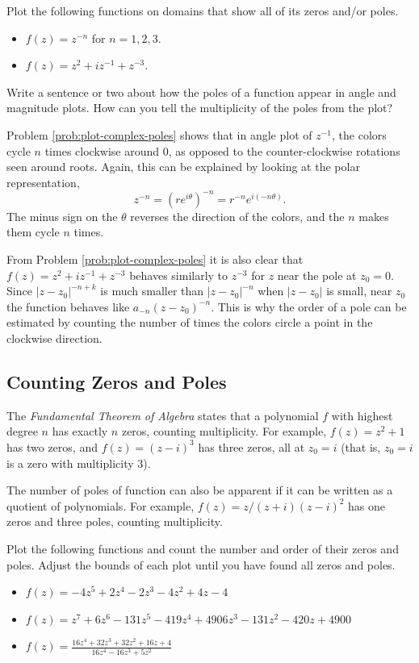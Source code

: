 \begin{problem} %
Plot the following functions on domains that show all of its zeros and/or poles.
\begin{itemize}
\item $f(z) = z^{-n}$ for $n=1,2,3$.
\item $f(z) = z^2+iz^{-1}+z^{-3}$.
\end{itemize}
Write a sentence or two about how the poles of a function appear in angle and magnitude plots.
How can you tell the multiplicity of the poles from the plot?
\label{prob:plot-complex-poles}
\end{problem}

Problem \ref{prob:plot-complex-poles} shows that in angle plot of $z^{-1}$, the colors cycle $n$ times clockwise around $0$, as opposed to the counter-clockwise rotations seen around roots.
Again, this can be explained by looking at the polar representation,
\[
z^{-n} = (re^{i \theta})^{-n} = r^{-n} e^{i(-n\theta)}.
\]
The minus sign on the $\theta$ reverses the direction of the colors, and the $n$ makes them cycle $n$ times.

From Problem \ref{prob:plot-complex-poles} it is also clear that $f(z) = z^2+iz^{-1}+z^{-3}$ behaves similarly to $z^{-3}$ for $z$ near the pole at $z_0 = 0$.
Since $|z-z_0|^{-n+k}$ is much smaller than $|z-z_0|^{-n}$ when $|z-z_0|$ is small, near $z_0$ the function behaves like $a_{-n}(z-z_0)^{-n}$.
This is why the order of a pole can be estimated by counting the number of times the colors circle a point in the clockwise direction.

\subsection*{Counting Zeros and Poles} %

The \emph{Fundamental Theorem of Algebra} states that a polynomial $f$ with highest degree $n$ has exactly $n$ zeros, counting multiplicity.
For example, $f(z) = z^2 + 1$ has two zeros, and $f(z) = (z-i)^3$ has three zeros, all at $z_0 = i$ (that is, $z_0=i$ is a zero with multiplicity $3$).

The number of poles of function can also be apparent if it can be written as a quotient of polynomials.
For example, $f(z) = z / (z+i)(z-i)^2$ has one zeros and three poles, counting multiplicity.

\begin{problem}
Plot the following functions and count the number and order of their zeros and poles.
Adjust the bounds of each plot until you have found all zeros and poles.
\begin{itemize}
\item $f(z) = -4z^5 + 2z^4 - 2z^3 - 4z^2 + 4z - 4$
\item $f(z) = z^7 + 6z^6 - 131z^5 - 419z^4 + 4906z^3 - 131z^2 - 420z + 4900$
\item $f(z) = \frac{16z^4 + 32z^3 + 32z^2 + 16z + 4}{16z^4 - 16z^3 + 5z^2}$
\end{itemize}
\end{problem}

